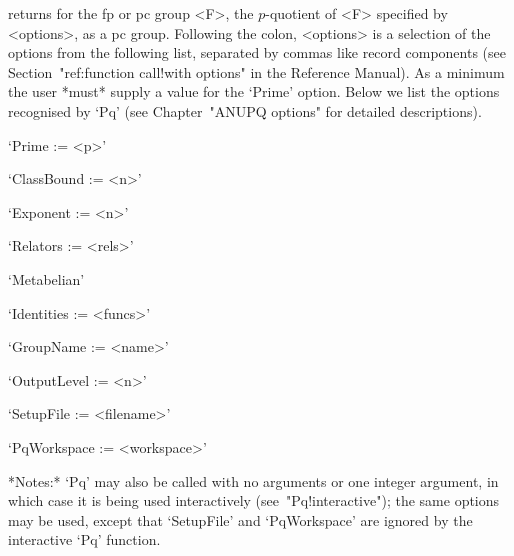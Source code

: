 returns for the fp or pc group <F>, the $p$-quotient of <F> specified  by
<options>, as a pc group. Following the colon, <options> is  a  selection
of the options from the following list, separated by commas  like  record
components (see Section~"ref:function call!with options"  in  the  {\GAP}
Reference Manual). As a minimum the user *must* supply a  value  for  the
`Prime' option. Below  we  list  the  options  recognised  by  `Pq'  (see
Chapter~"ANUPQ options" for detailed descriptions).

\beginlist%

\item{}`Prime := <p>'

\item{}`ClassBound := <n>'

\item{}`Exponent := <n>'

\item{}`Relators := <rels>'

\item{}`Metabelian'

\item{}`Identities := <funcs>'

\item{}`GroupName := <name>'

\item{}`OutputLevel := <n>'

\item{}`SetupFile := <filename>'

\item{}`PqWorkspace := <workspace>'

\endlist

*Notes:* `Pq' may also  be  called  with  no  arguments  or  one  integer
argument,   in   which   case   it   is    being    used    interactively
(see~"Pq!interactive");  the  same  options  may  be  used,  except  that
`SetupFile'  and  `PqWorkspace'  are  ignored  by  the  interactive  `Pq'
function.


